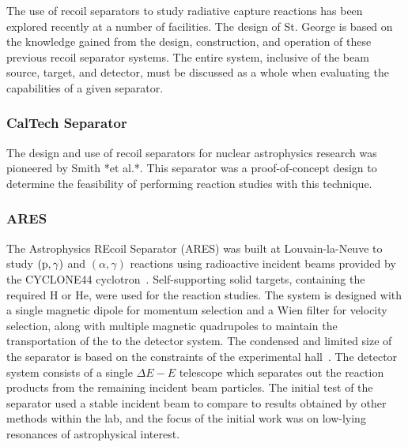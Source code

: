 The use of recoil separators to study radiative capture reactions has been
explored recently at a number of facilities. The design of St. George is based
on the knowledge gained from the design, construction, and operation of these
previous recoil separator systems. The entire system, inclusive of the beam
source, target, and detector, must be discussed as a whole when evaluating the
capabilities of a given separator.


\subsubsection{CalTech Separator}


The design and use of recoil separators for nuclear astrophysics research was
pioneered by Smith *et al.*. This separator was a proof-of-concept design to
determine the feasibility of performing reaction studies with this technique.


\subsubsection{ARES}

The Astrophysics REcoil Separator (ARES) was built at Louvain-la-Neuve to
study $(\rm{p},\gamma)$ and $(\alpha,\gamma)$ reactions using radioactive
incident beams provided by the CYCLONE44 cyclotron~\cite{Angulo2001}.
Self-supporting solid
targets, containing the required H or He, were used for the reaction
studies. The system is designed with a single magnetic dipole for momentum
selection and a Wien filter for velocity selection, along with multiple
magnetic quadrupoles to maintain the transportation of the to the detector
system. The condensed and limited size of the separator is based on the
constraints of the experimental hall~\cite{Couder2003}.
The detector system consists of a single
$\Delta E − E$ telescope which separates out the reaction products from the
remaining incident beam particles. The initial test of the separator used a
stable incident beam to compare to results obtained by other methods within
the lab, and the focus of the initial work was on low-lying resonances of
astrophysical interest.


